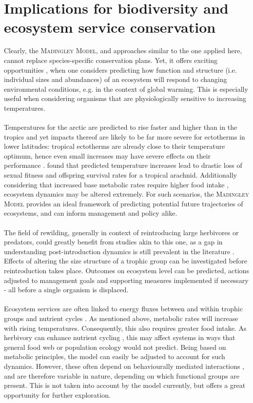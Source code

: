\section{Implications for biodiversity and ecosystem service conservation }
Clearly, the \textsc{Madingley Model}, and approaches similar to the one applied here, cannot replace species-specific conservation  plans. Yet, it offers exciting opportunities , when one considers predicting how function and structure (i.e. individual sizes and abundances) of an ecosystem will respond to changing environmental conditions, e.g. in the context of global warming. This is especially useful when considering organisms that are physiologically sensitive to increasing temperatures.\\\\
Temperatures for the arctic are predicted to rise faster and higher than in the tropics   and yet impacts thereof are likely to be far more severe for ectotherms in lower latitudes: tropical ectotherms are already close to their temperature optimum, hence even small increases may have severe effects on their performance \citep{Deutsch2008}. \cite{Zeh2012} found that predicted temperature increases lead to drastic loss of sexual fitness and offspring survival rates for a tropical arachnid. Additionally considering that increased base metabolic rates require higher food intake \citep{Dillon2010}, ecosystem dynamics may be altered extremely. For such scenarios, the \textsc{Madingley Model} provides an ideal framework of predicting potential future trajectories of ecosystems, and  can inform management and policy alike.\\\\
The field of rewilding, generally in context of reintroducing large herbivores or predators, could greatly benefit from studies akin to this one, as a gap in understanding post-introduction dynamics is still prevalent in the literature \citep[e.g.][]{Grange2012,Smit2015}. Effects of altering the size structure of a trophic group can be investigated before reintroduction takes place. Outcomes on ecosystem level can be predicted, actions adjusted to management goals and supporting measures implemented if necessary - all before a single organism is displaced. \\\\ 
Ecosystem services are often linked to energy fluxes between and within trophic groups and nutrient cycles \citep{Cardinale2012}. As mentioned above, metabolic rates will increase with rising temperatures. Consequently, this also requires greater food intake. As herbivory can enhance nutrient cycling \citep{Belovsky2000}, this may affect systems in ways that general food web or population ecology would not predict. Being based on metabolic principles, the model can easily be adjusted to account for such dynamics. However, these often depend on behaviourally mediated interactions \cite{Hawlena2010}, and are therefore variable in nature, depending on which functional groups are present. This is not taken into account by the model currently, but offers a great opportunity for further exploration.

